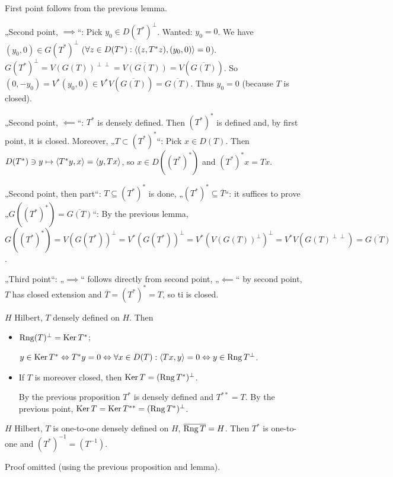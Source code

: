 \documentclass[12pt]{article}					%
\begin{document}
\begin{dukaz}
	First point follows from the previous lemma.

	„Second point, $\implies$“: Pick $y_0 \in D(T^*)^\perp$. Wanted: $y_0 = 0$. We have $(y_0, 0) \in G(T^*)^\perp$ ($\forall z \in D(T^*): \left\langle(z, T^*z), (y_0, 0)\right\rangle = 0$). $G(T^*)^\perp = V(G(T))^{\perp\perp} = \overline{V(G(T))} = V(\overline{G(T)})$. So $(0, -y_0) = V^*(y_0, 0) \in V^* V(\overline{G(T)}) = \overline{G(T)}$. Thus $y_0 = 0$ (because $T$ is closed).

	„Second point, $\impliedby$“: $T^*$ is densely defined. Then $(T^*)^*$ is defined and, by first point, it is closed. Moreover, „$T \subset (T^*)^*$“: Pick $x \in D(T)$. Then $D(T^*) \ni y \mapsto \left\langle T^* y, x\right\rangle = \left\langle y, Tx\right\rangle$, so $x \in D((T^*)^*)$ and $(T^*)^* x = Tx$.

	„Second point, then part“: $T \subseteq (T^*)^*$ is done, „$(T^*)^* \subseteq \overline{T}$“: it suffices to prove „$G((T^*)^*) = \overline{G(T)}$“: By the previous lemma, $G((T^*)^*) = V(G(T^*))^\perp = V^*(G(T^*))^\perp = V^*(V(G(T))^\perp)^\perp = V^*V(G(T)^{\perp\perp}) = \overline{G(T)}$.

	„Third point“: „$\implies$“ follows directly from second point, „$\impliedby$“ by second point, $T$ has closed extension and $\overline{T} = (T^*)^* = T$, so ti is closed.
\end{dukaz}

\begin{tvrzeni}
	$H$ Hilbert, $T$ densely defined on $H$. Then

	\begin{itemize}
		\item $\operatorname{Rng}(T)^\perp = \operatorname{Ker} T^*$;
			\begin{dukazin}
				$y \in \operatorname{Ker} T^* \Leftrightarrow T^*y = 0 \Leftrightarrow \forall x \in D(T): \left\langle Tx, y\right\rangle = 0 \Leftrightarrow y \in \operatorname{Rng} T^\perp$.
			\end{dukazin}
		\item If $T$ is moreover closed, then $\operatorname{Ker} T = (\operatorname{Rng} T^*)^\perp$.
			\begin{dukazin}
				By the previous proposition $T^*$ is densely defined and $T^{**} = T$. By the previous point, $\operatorname{Ker} T = \operatorname{Ker} T^{**} = (\operatorname{Rng} T^*)^\perp$.
			\end{dukazin}
	\end{itemize}
\end{tvrzeni}

\begin{tvrzeni}
	$H$ Hilbert, $T$ is one-to-one densely defined on $H$, $\overline{\operatorname{Rng} T} = H$. Then $T^*$ is one-to-one and $(T^*)^{-1} = (T^{-1})$.

	\begin{dukazin}
		Proof omitted (using the previous proposition and lemma).
	\end{dukazin}
\end{tvrzeni}
\end{document}
